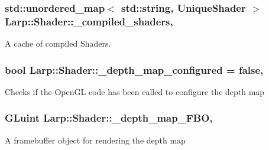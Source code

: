 \subsubsection[{\texorpdfstring{\+\_\+compiled\+\_\+shaders}{_compiled_shaders}}]{\setlength{\rightskip}{0pt plus 5cm}std\+::unordered\+\_\+map$<$ std\+::string, {\bf Unique\+Shader} $>$ Larp\+::\+Shader\+::\+\_\+compiled\+\_\+shaders\hspace{0.3cm}{\ttfamily [static]}, {\ttfamily [private]}}\hypertarget{classLarp_1_1Shader_ae703958195907f241cbeeee4f590557d}{}\label{classLarp_1_1Shader_ae703958195907f241cbeeee4f590557d}
A cache of compiled Shaders. 
\subsubsection[{\texorpdfstring{\+\_\+depth\+\_\+map\+\_\+configured}{_depth_map_configured}}]{\setlength{\rightskip}{0pt plus 5cm}bool Larp\+::\+Shader\+::\+\_\+depth\+\_\+map\+\_\+configured = false\hspace{0.3cm}{\ttfamily [static]}, {\ttfamily [private]}}\hypertarget{classLarp_1_1Shader_a4cbaff7764a508ced1df527b2bb084c0}{}\label{classLarp_1_1Shader_a4cbaff7764a508ced1df527b2bb084c0}
Checks if the Open\+GL code has been called to configure the depth map 
\subsubsection[{\texorpdfstring{\+\_\+depth\+\_\+map\+\_\+\+F\+BO}{_depth_map_FBO}}]{\setlength{\rightskip}{0pt plus 5cm}G\+Luint Larp\+::\+Shader\+::\+\_\+depth\+\_\+map\+\_\+\+F\+BO\hspace{0.3cm}{\ttfamily [static]}, {\ttfamily [private]}}\hypertarget{classLarp_1_1Shader_ac5489cdb566ed9b675d5544f4d849510}{}\label{classLarp_1_1Shader_ac5489cdb566ed9b675d5544f4d849510}
A framebuffer object for rendering the depth map 
